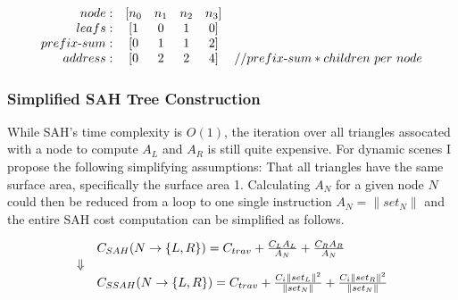 \begin{displaymath}
  \begin{array}{r c c c c l}
    node: & [n_0 & n_1 & n_2 & n_3]\\
    leafs: & [1 & 0 & 1 & 0]\\
    prefix\text{-}sum: & [0 & 1 & 1 & 2]\\
    address: & [0 & 2 & 2 & 4] & // prefix\text{-}sum * children\text{ }per\text{ } node\\
  \end{array}
\end{displaymath}



\subsubsection{Simplified SAH Tree Construction}


While SAH's time complexity is $O(1)$, the iteration over all triangles
assocated with a node to compute $A_L$ and $A_R$ is still quite expensive. For
dynamic scenes I propose the following simplifying assumptions: That all
triangles have the same surface area, specifically the surface area
1. Calculating $A_N$ for a given node $N$ could then be reduced from a loop to
one single instruction $A_N = \|set_N\|$ and the entire SAH cost computation can
be simplified as follows.

\begin{displaymath}
  \begin{array}{r l}
    & C_{SAH}(N \rightarrow \{L, R\}) = C_{trav} + \frac{C_L A_L}{A_N} + \frac{C_R
      A_R}{A_N}\\
    \Downarrow \\
    & C_{SSAH}(N \rightarrow \{L, R\}) = C_{trav} +
    \frac{C_i \|set_L\|^2}{\|set_N\|} + \frac{C_i \|set_R\|^2}{\|set_N\|}\\
  \end{array}
\end{displaymath}


